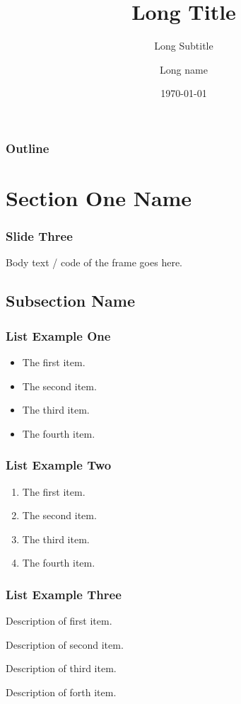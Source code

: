 \documentclass{beamer}
\title[Short title]{Long Title}
\subtitle[Short Subtitle]{Long Subtitle}
\author[Short Name]{Long name}
\date[Short Date]{\today}
\begin{document}
\begin{frame}
\titlepage
\end{frame}

\begin{frame}
\frametitle{Outline} 
\tableofcontents  
\end{frame}


\section{Section One Name}

\begin{frame}
\frametitle{Slide Three} 
Body text / code of the frame goes here. 
\end{frame} 


\subsection{Subsection Name}

\begin{frame}
\frametitle{List Example One}
\begin{itemize} 
\item The first item.
\item The second item.
\item The third item.
\item The fourth item.
\end{itemize}
\end{frame}

\begin{frame}
\frametitle{List Example Two}
\begin{enumerate} 
\item The first item.
\item The second item.
\item The third item.
\item The fourth item.
\end{enumerate}
\end{frame}

\begin{frame}
\frametitle{List Example Three}
\begin{description} 
\item[First Item] Description of first item.
\item[Second Item] Description of second item.
\item[Third Item] Description of third item.
\item[Forth Item] Description of forth item.
\end{description}
\end{frame}
\end{document}
